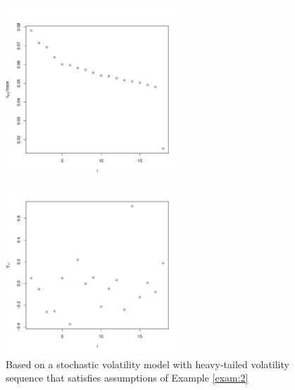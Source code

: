 \begin{figure}[htb]
  \centering
  \begin{minipage}{0.48\linewidth}
    \includegraphics[width=6.5cm]{LightTailedCase2_eigenvalues.pdf}
  \end{minipage}
  \begin{minipage}{0.48\linewidth}
    \includegraphics[width=6.5cm]{LightTailedCase2_eigenvector1.pdf}
  \end{minipage}
  \caption{Based on a stochastic volatility model with heavy-tailed
    volatility sequence that satisfies assumptions of Example
    \ref{exam:2}}
  \label{eigen:model3}
\end{figure}


